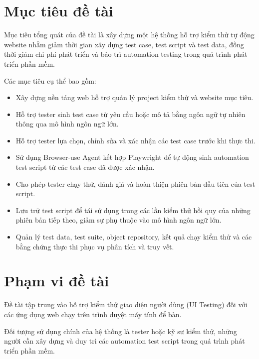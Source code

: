 \section{Mục tiêu đề tài}

Mục tiêu tổng quát của đề tài là xây dựng một hệ thống hỗ trợ kiểm thử tự động website nhằm giảm thời gian xây dựng test case, test script và test data, đồng thời giảm chi phí phát triển và bảo trì automation testing trong quá trình phát triển phần mềm.

Các mục tiêu cụ thể bao gồm:

\begin{itemize}
    \item Xây dựng nền tảng web hỗ trợ quản lý project kiểm thử và website mục tiêu.
    
    \item Hỗ trợ tester sinh test case từ yêu cầu hoặc mô tả bằng ngôn ngữ tự nhiên thông qua mô hình ngôn ngữ lớn.

    \item Hỗ trợ tester lựa chọn, chỉnh sửa và xác nhận các test case trước khi thực thi.

    \item Sử dụng Browser-use Agent kết hợp Playwright để tự động sinh automation test script từ các test case đã được xác nhận.

    \item Cho phép tester chạy thử, đánh giá và hoàn thiện phiên bản đầu tiên của test script.

    \item Lưu trữ test script để tái sử dụng trong các lần kiểm thử hồi quy của những phiên bản tiếp theo, giảm sự phụ thuộc vào mô hình ngôn ngữ lớn.

    \item Quản lý test data, test suite, object repository, kết quả chạy kiểm thử và các bằng chứng thực thi phục vụ phân tích và truy vết.
\end{itemize}

\section{Phạm vi đề tài}

Đề tài tập trung vào hỗ trợ kiểm thử giao diện người dùng (UI Testing) đối với các ứng dụng web chạy trên trình duyệt máy tính để bàn.

Đối tượng sử dụng chính của hệ thống là tester hoặc kỹ sư kiểm thử, những người cần xây dựng và duy trì các automation test script trong quá trình phát triển phần mềm.

